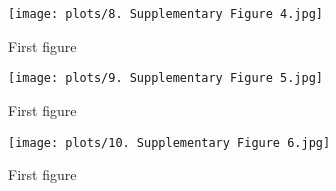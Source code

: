 \documentclass[9pt,twoside,lineno]{pnas-new}
\begin{document}
\begin{figure}
\centering
\texttt{[image: plots/8. Supplementary Figure 4.jpg]}
\caption{First figure}
\end{figure}

\begin{figure}
\centering
\texttt{[image: plots/9. Supplementary Figure 5.jpg]}
\caption{First figure}
\end{figure}

\begin{figure}
\centering
\texttt{[image: plots/10. Supplementary Figure 6.jpg]}
\caption{First figure}
\end{figure}
\end{document}
